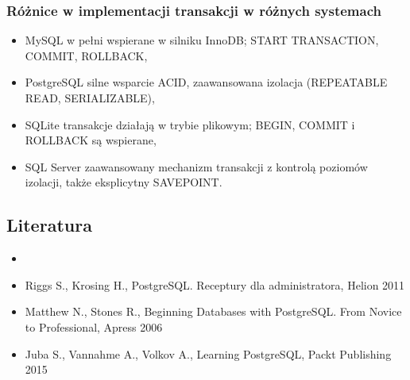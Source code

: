 \documentclass[a4paper,11pt,openany,english]{sphinxmanual}
\begin{document}
\subsubsection{Różnice w implementacji transakcji w różnych systemach}
\label{\detokenize{rozdzial2/Kontrola_i_konserwacja/kontrola_i_konserwacja:roznice-w-implementacji-transakcji-w-roznych-systemach}}\begin{itemize}
\item {} 
\sphinxAtStartPar
MySQL \sphinxhyphen{} w pełni wspierane w silniku InnoDB; START TRANSACTION, COMMIT, ROLLBACK,

\item {} 
\sphinxAtStartPar
PostgreSQL \sphinxhyphen{} silne wsparcie ACID, zaawansowana izolacja (REPEATABLE READ, SERIALIZABLE),

\item {} 
\sphinxAtStartPar
SQLite \sphinxhyphen{} transakcje działają w trybie plikowym; BEGIN, COMMIT i ROLLBACK są wspierane,

\item {} 
\sphinxAtStartPar
SQL Server \sphinxhyphen{} zaawansowany mechanizm transakcji z kontrolą poziomów izolacji, także eksplicytny SAVEPOINT.

\end{itemize}


\subsection{Literatura}
\label{\detokenize{rozdzial2/Kontrola_i_konserwacja/kontrola_i_konserwacja:literatura}}\begin{itemize}
\item {} 
\sphinxAtStartPar
{}

\item {} 
\sphinxAtStartPar
Riggs S., Krosing H., PostgreSQL. Receptury dla administratora, Helion 2011

\item {} 
\sphinxAtStartPar
Matthew N., Stones R., Beginning Databases with PostgreSQL. From Novice to Professional, Apress 2006

\item {} 
\sphinxAtStartPar
Juba S., Vannahme A., Volkov A., Learning PostgreSQL, Packt Publishing 2015

\end{itemize}

\sphinxstepscope
\end{document}
